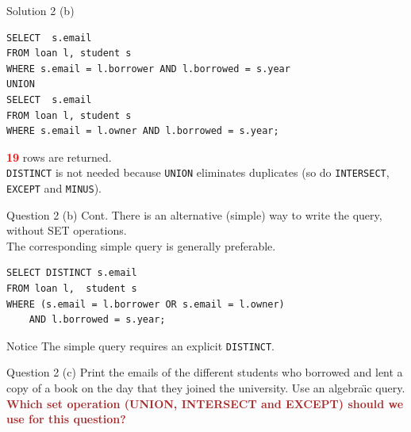\begin{frame}[fragile]{Solution 2 (b)}

\begin{lstlisting}
SELECT  s.email 
FROM loan l, student s 
WHERE s.email = l.borrower AND l.borrowed = s.year
UNION
SELECT  s.email 
FROM loan l, student s 
WHERE s.email = l.owner AND l.borrowed = s.year;
\end{lstlisting}

\textcolor{red}{\textbf{19}} rows are returned.\\
\vspace{5pt}
\texttt{DISTINCT} is not needed because \texttt{UNION}  eliminates duplicates (so do \texttt{INTERSECT}, \texttt{EXCEPT} and \texttt{MINUS}). 

\end{frame}

\begin{frame}[fragile]{Question 2 (b) Cont.}
There is an alternative (simple) way to write the query, without SET operations.\\
\vspace{10pt}
The corresponding simple query is generally preferable.

\begin{lstlisting}
SELECT DISTINCT s.email 
FROM loan l,  student s 
WHERE (s.email = l.borrower OR s.email = l.owner) 
	AND l.borrowed = s.year;
\end{lstlisting}

\begin{alertblock}{Notice}
The simple query requires an explicit \texttt{DISTINCT}.	
\end{alertblock}

\end{frame}

\begin{frame}[fragile]{Question 2 (c)}
Print the emails of the different students who borrowed and lent a copy of a book on the day that they joined the university. Use an algebra\"{\i}c query.\\
\vspace{10pt}
\textcolor{brown}{\textbf{Which set operation (UNION, INTERSECT and EXCEPT) should we use for this question?}}
\end{frame}


